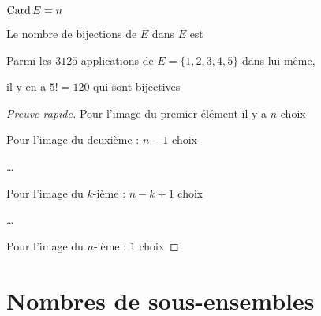 
\begin{frame}

$\mathop{\text{Card}}\nolimits E = n$
\begin{proposition}
Le nombre de bijections de $E$ dans $E$ est 
\pause
{}
\end{proposition}

\pause

\begin{exemple}
Parmi les $3125$ applications de $E=\{1,2,3,4,5\}$ dans lui-même,

il y en a $5! = 120$ qui sont bijectives
\end{exemple}

\pause

\begin{proof}[Preuve rapide]
Pour l'image du premier élément il y a $n$ choix

\pause

Pour l'image du deuxième : $n-1$ choix

\pause

\ldots

Pour l'image du $k$-ième : $n-k+1$ choix

\ldots

\pause

Pour l'image du $n$-ième : $1$ choix
\end{proof}
  
\end{frame}

\section{Nombres de sous-ensembles}

